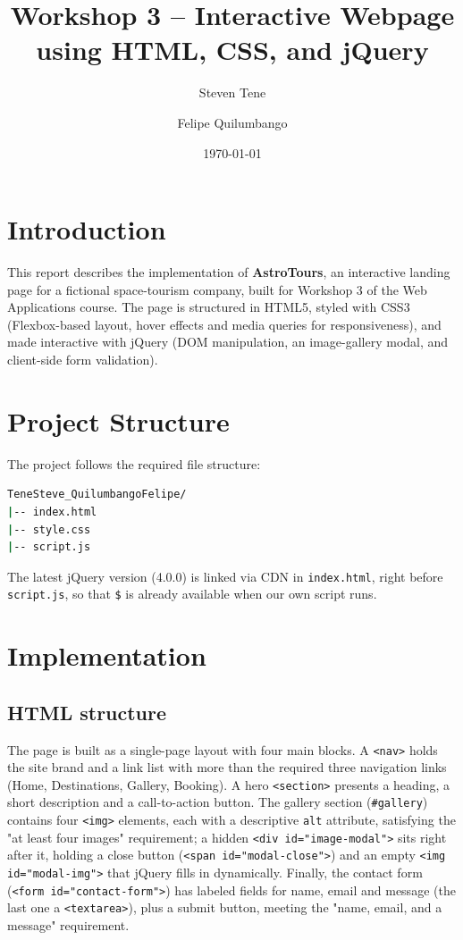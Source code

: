 \documentclass[12pt, a4paper]{article}
\title{\vspace{-1.5cm}\bfseries Workshop 3 -- Interactive Webpage using HTML, CSS, and jQuery}
\author{Steven Tene \and Felipe Quilumbango}
\date{\today}
\begin{document}
\maketitle
\thispagestyle{fancy} %


\section{Introduction}

This report describes the implementation of \textbf{AstroTours}, an interactive landing
page for a fictional space-tourism company, built for Workshop 3 of the Web Applications
course. The page is structured in HTML5, styled with CSS3 (Flexbox-based layout, hover
effects and media queries for responsiveness), and made interactive with jQuery (DOM
manipulation, an image-gallery modal, and client-side form validation).

\section{Project Structure}

The project follows the required file structure:

\begin{lstlisting}[language=bash, caption={Project structure}]
TeneSteve_QuilumbangoFelipe/
|-- index.html
|-- style.css
|-- script.js
\end{lstlisting}

The latest jQuery version (4.0.0) is linked via CDN in \texttt{index.html}, right before
\texttt{script.js}, so that \texttt{\$} is already available when our own script runs.

\section{Implementation}

\subsection{HTML structure}

The page is built as a single-page layout with four main blocks. A \texttt{<nav>}
holds the site brand and a link list with more than the required three navigation
links (Home, Destinations, Gallery, Booking). A hero \texttt{<section>} presents a
heading, a short description and a call-to-action button. The gallery section
(\texttt{\#gallery}) contains four \texttt{<img>} elements, each with a descriptive
\texttt{alt} attribute, satisfying the "at least four images" requirement; a hidden
\texttt{<div id="image-modal">} sits right after it, holding a close button
(\texttt{<span id="modal-close">}) and an empty \texttt{<img id="modal-img">} that
jQuery fills in dynamically. Finally, the contact form (\texttt{<form
id="contact-form">}) has labeled fields for name, email and message (the last one a
\texttt{<textarea>}), plus a submit button, meeting the "name, email, and a message"
requirement.
\end{document}

